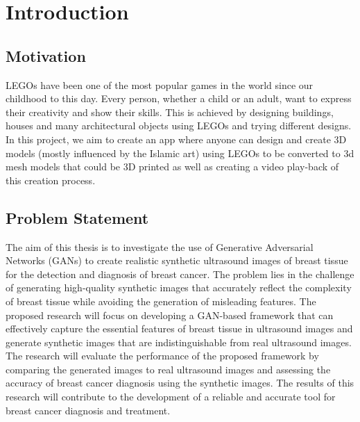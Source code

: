 \chapter{Introduction}
\label{chap:One}
\section{Motivation}
LEGOs have been one of the most popular games in the world since our childhood to this day. Every person, whether a child or an adult, want to express their creativity and show their skills. This is achieved by designing buildings, houses and many architectural objects using LEGOs and trying different designs. In this project, we aim to create an app where anyone can design and create 3D models (mostly influenced by the Islamic art) using LEGOs to be converted to 3d mesh models that could be 3D printed as well as creating a video play-back of this creation process.\par

\section{Problem Statement}
The aim of this thesis is to investigate the use of Generative Adversarial Networks (GANs) to create realistic synthetic ultrasound images of breast tissue for the detection and diagnosis of breast cancer. The problem lies in the challenge of generating high-quality synthetic images that accurately reflect the complexity of breast tissue while avoiding the generation of misleading features. The proposed research will focus on developing a GAN-based framework that can effectively capture the essential features of breast tissue in ultrasound images and generate synthetic images that are indistinguishable from real ultrasound images. The research will evaluate the performance of the proposed framework by comparing the generated images to real ultrasound images and assessing the accuracy of breast cancer diagnosis using the synthetic images. The results of this research will contribute to the development of a reliable and accurate tool for breast cancer diagnosis and treatment.
 \vspace{1cm}


